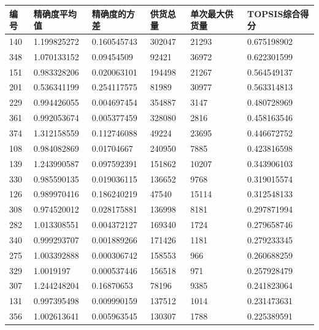 \documentclass{cumcmthesis}
\begin{document}
\begin{longtable}{l|llll|l}
    \toprule
    编号 & 精确度平均值 & 精确度的方差 & 供货总量 & 单次最大供货量 & TOPSIS综合得分 \\
    \midrule
    140  & 1.199825272  & 0.160545743  & 302047   & 21293          & 0.675198902    \\
    348  & 1.070133152  & 0.09454509   & 92421    & 36972          & 0.622301599    \\
    151  & 0.983328206  & 0.020063101  & 194498   & 21267          & 0.564549137    \\
    201  & 0.536341199  & 0.254117575  & 81989    & 30977          & 0.563314813    \\
    229  & 0.994426055  & 0.004697454  & 354887   & 3147           & 0.480728969    \\
    361  & 0.992053674  & 0.005377459  & 328080   & 2816           & 0.458163546    \\
    374  & 1.312158559  & 0.112746088  & 49224    & 23695          & 0.446672752    \\
    108  & 0.984082869  & 0.01704667   & 240950   & 7885           & 0.423816598    \\
    139  & 1.243990587  & 0.097592391  & 151862   & 10207          & 0.343906103    \\
    330  & 0.985590135  & 0.019036115  & 136652   & 9768           & 0.319015574    \\
    126  & 0.989970416  & 0.186240219  & 47540    & 15114          & 0.312548133    \\
    308  & 0.974520012  & 0.028175881  & 136998   & 8181           & 0.297871994    \\
    282  & 1.013308551  & 0.004372127  & 169340   & 1724           & 0.279658746    \\
    340  & 0.999293707  & 0.001889266  & 171426   & 1181           & 0.279233345    \\
    275  & 1.003392888  & 0.000306742  & 158553   & 966            & 0.260688259    \\
    329  & 1.0019197    & 0.000537446  & 156518   & 971            & 0.257928479    \\
    307  & 1.244248204  & 0.16870653   & 78196    & 9385           & 0.241823064    \\
    131  & 0.997395498  & 0.009990159  & 137512   & 1014           & 0.231473631    \\
    356  & 1.002613641  & 0.005963545  & 130307   & 1788           & 0.225389591    \\

\end{longtable}
\end{document}
